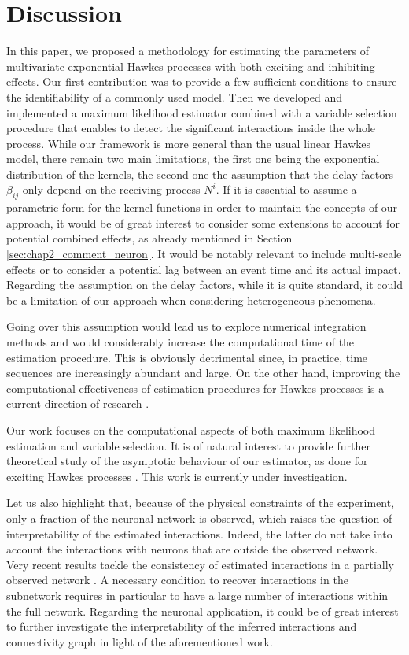 \section{Discussion}
\label{sec:chap2_discussion}
In this paper, we proposed a methodology for estimating the parameters of multivariate exponential Hawkes processes with both exciting and inhibiting effects. Our first contribution was to provide a few sufficient conditions to ensure the identifiability of a commonly used model. Then we developed and implemented a maximum likelihood estimator combined with a variable selection procedure that enables to detect the significant interactions inside the whole process.
While our framework is more general than the usual linear Hawkes model, there remain two main limitations, the first one being the exponential distribution of the kernels, the second one the assumption that the delay factors \(\beta_{ij}\)
only depend on the receiving process \(N^i\). If it is essential to assume a parametric form for the kernel functions in order to maintain the concepts of our approach, it would be of great interest to consider some extensions to account for potential combined effects, as already mentioned in Section \ref{sec:chap2_comment_neuron}. It would be notably relevant to include multi-scale effects or to consider a potential lag between an event time and its actual impact.  Regarding the assumption on the delay factors, while it is quite standard, it could be a limitation of our approach when considering heterogeneous phenomena.

Going over this assumption would lead us to explore numerical integration methods and would considerably increase the computational time of the estimation procedure.
This is obviously detrimental since, in practice, time sequences are increasingly abundant and large.
On the other hand, improving the computational effectiveness of estimation procedures for Hawkes processes is a current direction of research \parencite{Bompaire2018bis}.

Our work focuses on the computational aspects of both maximum likelihood estimation and variable selection. It is of natural interest to provide further theoretical study of the asymptotic behaviour of our estimator, as done for exciting Hawkes processes \parencite{Guo2018}.
This work is currently under investigation.

Let us also highlight that, because of the physical constraints of the experiment, only a fraction of the neuronal network is observed, which raises the question of interpretability of the estimated interactions.
Indeed, the latter do not take into account the interactions with neurons that are outside the observed network.
Very recent results tackle the consistency of estimated interactions in a partially observed network \parencite{Reynaud2022}.
A necessary condition to recover interactions in the subnetwork requires in particular to have a large number of interactions within the full network.
Regarding the neuronal application, it could be of great interest to further investigate the interpretability of the inferred interactions and connectivity graph in light of the aforementioned work.


